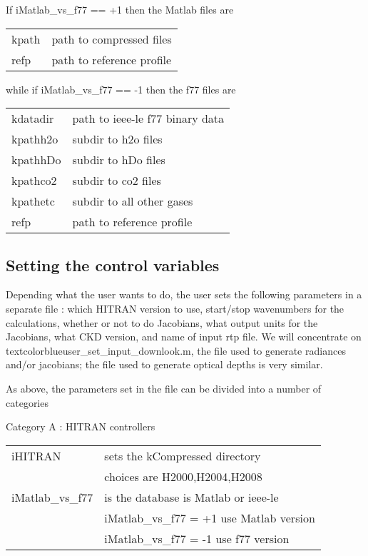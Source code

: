 \documentclass[12pt]{article}
\begin{document}
If iMatlab\_vs\_f77 == +1 then the Matlab files are \\
\vspace{0.2in}
\begin{tabular}{ll}
\hline
kpath & path to compressed files \\
refp  & path to reference profile\\
\hline
\end{tabular}

\newpage 
while if iMatlab\_vs\_f77 == -1 then the f77 files are\\ 
\vspace{0.2in}
\begin{tabular}{ll}
\hline
kdatadir & path to ieee-le f77 binary data \\
kpathh2o & subdir to h2o files\\
kpathhDo & subdir to hDo files\\
kpathco2 & subdir to co2 files\\
kpathetc & subdir to all other gases\\
refp  & path to reference profile\\
\hline
\end{tabular}

\subsection{Setting the control variables}
Depending what the user wants to do, the user sets the following parameters 
in a separate file : which HITRAN version to use, start/stop wavenumbers for
the calculations, whether or not to do Jacobians, what output units for the
Jacobians, what CKD version, and name of input rtp file. We will concentrate
on textcolor{blue}{user\_set\_input\_downlook.m}, the file used to generate 
radiances and/or jacobians; the file used to generate optical depths is very similar.

As above, the parameters set in the file can be divided into a number
of categories

\vspace{0.2in}
\noindent Category A : HITRAN controllers\\
\vspace{0.2in}
\begin{tabular}{ll}
\hline
iHITRAN & sets the kCompressed directory\\
        & choices are H2000,H2004,H2008\\
iMatlab\_vs\_f77 & is the database is Matlab or ieee-le \\\
  & iMatlab\_vs\_f77 = +1   use Matlab version \\
  & iMatlab\_vs\_f77 = -1   use f77 version\\
\end{tabular}
\end{document}
